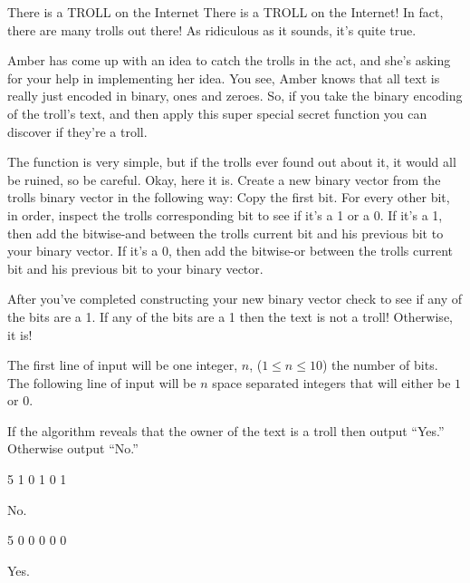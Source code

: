 \begin{problem}{There is a TROLL on the Internet}
There is a TROLL on the Internet!
In fact, there are many trolls out there!
As ridiculous as it sounds, it's quite true.

Amber has come up with an idea to catch the trolls in the act, and she's asking for your help in implementing her idea.
You see, Amber knows that all text is really just encoded in binary, ones and zeroes.
So, if you take the binary encoding of the troll's text, and then apply this super special secret function you can discover if they're a troll.

The function is very simple, but if the trolls ever found out about it, it would all be ruined, so be careful.
Okay, here it is.
Create a new binary vector from the trolls binary vector in the following way:
Copy the first bit.
For every other bit, in order, inspect the trolls corresponding bit to see if it's a 1 or a 0.
If it's a 1, then add the bitwise-and between the trolls current bit and his previous bit to your binary vector.
If it's a 0, then add the bitwise-or between the trolls current bit and his previous bit to your binary vector.

After you've completed constructing your new binary vector check to see if any of the bits are a 1.
If any of the bits are a 1 then the text is not a troll!
Otherwise, it is!
\end{problem}

\begin{formalin}
The first line of input will be one integer, $n$, ($1 \leq n \leq 10$) the number of bits.
The following line of input will be $n$ space separated integers that will either be $1$ or $0$.
\end{formalin}

\begin{formalout}
If the algorithm reveals that the owner of the text is a troll then output ``Yes.''
Otherwise output ``No.''
\end{formalout}

\begin{datain}
5
1 0 1 0 1
\end{datain}
\begin{dataout}
No.
\end{dataout}

\begin{datain}
5
0 0 0 0 0
\end{datain}
\begin{dataout}
Yes.
\end{dataout}

